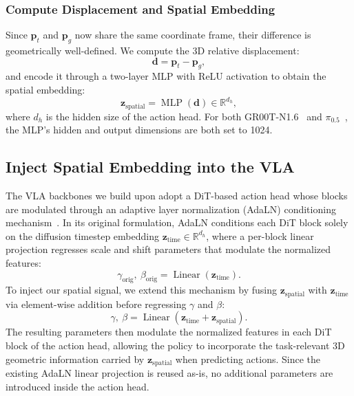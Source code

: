 \subsubsection{Compute Displacement and Spatial Embedding}
Since $\mathbf{p}_t$ and $\mathbf{p}_g$ now share the same coordinate frame, their difference is geometrically well-defined. We compute the 3D relative displacement:
\begin{equation}
\mathbf{d} = \mathbf{p}_t - \mathbf{p}_g,
\end{equation}
and encode it through a two-layer MLP with ReLU activation to obtain the spatial embedding:
\begin{equation}
    \mathbf{z}_{\text{spatial}} = \operatorname{MLP}(\mathbf{d}) \in  \mathbb{R}^{d_h},
    \label{eq:mlp}
\end{equation}
where $d_h$ is the hidden size of the action head. For both GR00T-N1.6~\cite{gr00tn1_2025} and $\pi_{0.5}$~\cite{pi05}, the MLP's hidden and output dimensions are both set to 1024.


\subsection{Inject Spatial Embedding into the VLA}
\label{supp:sec:subsec:app_inject}

The VLA backbones we build upon adopt a DiT-based action head whose blocks are modulated through an adaptive layer normalization (AdaLN) conditioning mechanism~\cite{DiT, perez2018film}. In its original formulation, AdaLN conditions each DiT block solely on the diffusion timestep embedding $\mathbf{z}_{\text{time}} \in \mathbb{R}^{d_h}$, where a per-block linear projection regresses scale and shift parameters that modulate the normalized features:
\begin{equation}
    \gamma_{\text{orig}},\ \beta_{\text{orig}}
    = \operatorname{Linear}(\mathbf{z}_{\text{time}}).
    \label{eq:adaln_orig}
\end{equation}
To inject our spatial signal, we extend this mechanism by fusing $\mathbf{z}_{\text{spatial}}$ with $\mathbf{z}_{\text{time}}$ via element-wise addition before regressing $\gamma$ and $\beta$:
\begin{equation}
    \gamma,\ \beta
    = \operatorname{Linear}(\mathbf{z}_{\text{time}}
      + \mathbf{z}_{\text{spatial}}).
    \label{eq:adaln_ours}
\end{equation}
The resulting parameters then modulate the normalized features in each DiT block of the action head, allowing the policy to incorporate the task-relevant 3D geometric information carried by $\mathbf{z}_{\text{spatial}}$ when predicting actions. Since the existing AdaLN linear projection is reused as-is, no additional parameters are introduced inside the action head.

